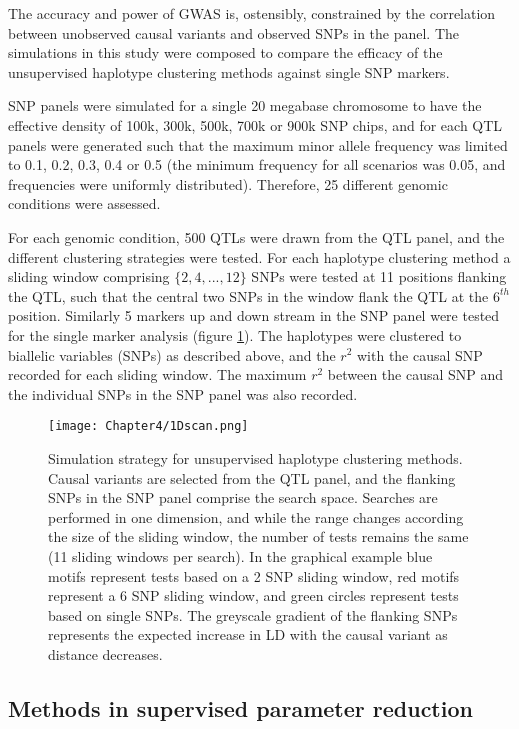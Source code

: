 The accuracy and power of GWAS is, ostensibly, constrained by the correlation between unobserved causal variants and observed SNPs in the panel. The simulations in this study were composed to compare the efficacy of the unsupervised haplotype clustering methods against single SNP markers.

SNP panels were simulated for a single 20 megabase chromosome to have the effective density of 100k, 300k, 500k, 700k or 900k SNP chips, and for each QTL panels were generated such that the maximum minor allele frequency was limited to 0.1, 0.2, 0.3, 0.4 or 0.5 (the minimum frequency for all scenarios was 0.05, and frequencies were uniformly distributed). Therefore, 25 different genomic conditions were assessed.

For each genomic condition, 500 QTLs were drawn from the QTL panel, and the different clustering strategies were tested. For each haplotype clustering method a sliding window comprising $\{2, 4, ..., 12\}$ SNPs were tested at 11 positions flanking the QTL, such that the central two SNPs in the window flank the QTL at the $6^{th}$ position. Similarly 5 markers up and down stream in the SNP panel were tested for the single marker analysis (figure \ref{fig:1Dscan}). The haplotypes were clustered to biallelic variables (SNPs) as described above, and the $r^2$ with the causal SNP recorded for each sliding window. The maximum $r^2$ between the causal SNP and the individual SNPs in the SNP panel was also recorded.

\begin{figure}
\begin{center}
\texttt{[image: Chapter4/1Dscan.png]}
\caption[Simulation strategy 1D scans]{Simulation strategy for unsupervised haplotype clustering methods. Causal variants are selected from the QTL panel, and the flanking SNPs in the SNP panel comprise the search space. Searches are performed in one dimension, and while the range changes according the size of the sliding window, the number of tests remains the same (11 sliding windows per search). In the graphical example blue motifs represent tests based on a 2 SNP sliding window, red motifs represent a 6 SNP sliding window, and green circles represent tests based on single SNPs. The greyscale gradient of the flanking SNPs represents the expected increase in LD with the causal variant as distance decreases.}
\label{fig:1Dscan}
\end{center}
\end{figure}


\subsection{Methods in supervised parameter reduction} \label{sec:methods_supervised}

